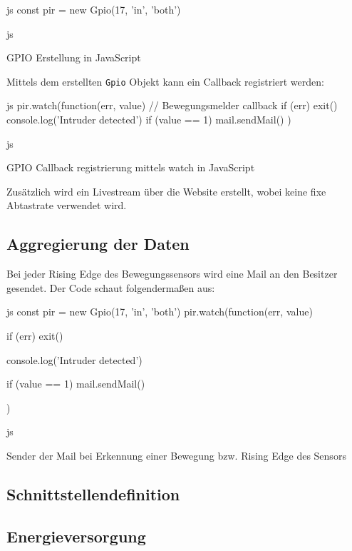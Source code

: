 \begin{listing}
    \begin{code}{js}
    const pir = new Gpio(17, 'in', 'both')
    \end{code}{js}
    \caption{GPIO Erstellung in JavaScript}
\end{listing}

Mittels dem erstellten \texttt{Gpio} Objekt kann ein Callback registriert werden:

\begin{listing}
    \begin{code}[firstnumber=last]{js}
    pir.watch(function(err, value) {
        // Bewegungsmelder callback
        if (err) exit()
        console.log('Intruder detected')
        if (value == 1) {
            mail.sendMail()
        }
    })
    \end{code}{js}
    \caption{GPIO Callback registrierung mittels watch in JavaScript}
\end{listing}

Zusätzlich wird ein Livestream über die Website erstellt, wobei keine fixe Abtastrate verwendet wird.

\clearpage
\subsection{Aggregierung der Daten}
Bei jeder Rising Edge des Bewegungssensors wird eine Mail an den Besitzer gesendet. Der Code schaut folgendermaßen aus:
\begin{listing}
    \begin{code}[firstnumber=last]{js}
    const pir = new Gpio(17, 'in', 'both')
    pir.watch(function(err, value) {
        if (err) exit()

        console.log('Intruder detected')

        if (value == 1) {
            mail.sendMail()
        }
    })
    \end{code}{js}
    \caption{Sender der Mail bei Erkennung einer Bewegung bzw. Rising Edge des Sensors}
\end{listing}

\subsection{Schnittstellendefinition}

\subsection{Energieversorgung}

